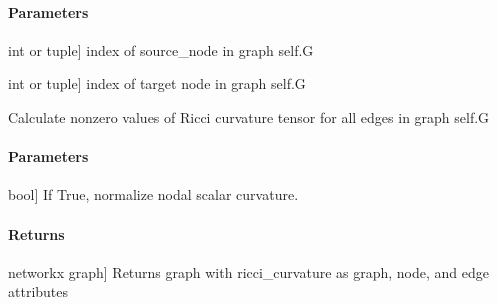 \documentclass[letterpaper,10pt,english]{sphinxmanual}
\begin{document}
\begin{fulllineitems}
\begin{fulllineitems}
\paragraph{Parameters}
\label{\detokenize{graph_ricci_curvature:id1}}\begin{description}
\sphinxlineitem{source\_node}{[}int or tuple{]}
\sphinxAtStartPar
index of source\_node in graph self.G

\sphinxlineitem{target\_node}{[}int or tuple{]}
\sphinxAtStartPar
index of target node in graph self.G

\end{description}

\end{fulllineitems}


\begin{fulllineitems}
\label{\detokenize{graph_ricci_curvature:graph_ricci_curvature.forman_ricci_curvature.FormanRicciCurvature.calculate_ricci_curvature}}
\pysigstartsignatures
{}
\pysigstopsignatures
\sphinxAtStartPar
Calculate nonzero values of Ricci curvature tensor for all edges in
graph self.G


\paragraph{Parameters}
\label{\detokenize{graph_ricci_curvature:id2}}\begin{description}
\sphinxlineitem{norm}{[}bool{]}
\sphinxAtStartPar
If True, normalize nodal scalar curvature.

\end{description}


\paragraph{Returns}
\label{\detokenize{graph_ricci_curvature:returns}}\begin{description}
\sphinxlineitem{self.G}{[}networkx graph{]}
\sphinxAtStartPar
Returns graph with ricci\_curvature as graph, node, and edge attributes

\end{description}

\end{fulllineitems}


\end{fulllineitems}
\end{document}
